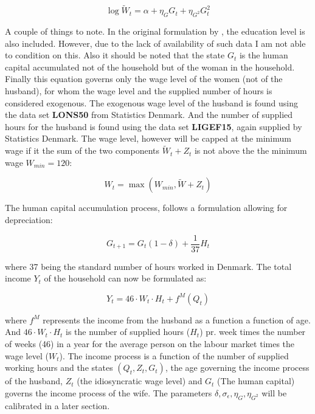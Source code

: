 \begin{equation}
    \log \tilde{W}_t = \alpha + \eta_G G_t + \eta_{G^2} G_t^2
\end{equation}

A couple of things to note. In the original formulation by \textcite{lemieux_mincer_2006}, the education level is also included. However, due to the lack of availability of such data I am not able to condition on this. Also it should be noted that the state $G_t$ is the human capital accumulated not of the household but of the woman in the household. Finally this equation governs only the wage level of the women (not of the husband), for whom the wage level and the supplied number of hours is considered exogenous. The exogenous wage level of the husband is found using the data set \textbf{LONS50} from Statistics Denmark. And the number of supplied hours for the husband is found using the data set \textbf{LIGEF15}, again supplied by Statistics Denmark. The wage level, however will be capped at the minimum wage if it the sum of the two components $\tilde{W}_t + Z_t$ is not above the the minimum wage $W_{min} = 120$: 

\begin{equation}
    W_t = \max ( W_{min}, \tilde{W} + Z_t)
\end{equation}

The human capital accumulation process, follows a formulation allowing for depreciation:

\begin{equation}
    G_{t+1} = G_t (1-\delta)  + \frac{1}{37} H_t 
\end{equation}

where 37 being the standard number of hours worked in Denmark. The total income $Y_t$ of the household can now be formulated as:

\begin{equation}
    Y_t = 46 \cdot W_t \cdot H_t + f^M(Q_t)
\end{equation}

where $f^M$ represents the income from the husband as a function a function of age. And $46 \cdot W_t \cdot H_t$ is the number of supplied hours ($H_t$) pr. week times the number of weeks (46) in a year for the average person on the labour market times the wage level ($W_t$). The income process is a function of the number of supplied working hours and the states $(Q_t, Z_t, G_t)$, the age governing the income process of the husband,  $Z_t$ (the idiosyncratic wage level) and $G_t$ (The human capital) governs the income process of the wife. The parameters $\delta, \sigma_\epsilon, \eta_G, \eta_{G^{2}}$ will be calibrated in a later section.

